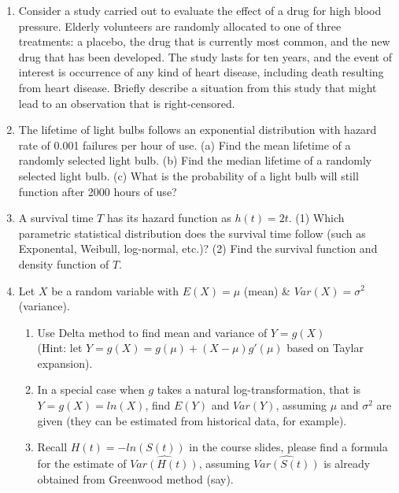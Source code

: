 \begin{enumerate}


\item Consider a study carried out to evaluate the effect of a drug for high blood pressure. Elderly volunteers are randomly allocated to one of three treatments: a placebo, the drug that is currently most common, and the new drug that has been developed. The study lasts for ten years, and the event of interest is occurrence of any kind of heart disease, including death resulting from heart disease. Briefly describe a situation from this study that might lead to an observation that is right-censored.

 \vspace{7 cm}

\item The lifetime of light bulbs follows an exponential distribution with hazard rate of 0.001 failures per hour of use. (a) Find the mean lifetime of a randomly selected light bulb. (b) Find the median lifetime of a randomly selected light bulb. (c) What is the probability of a light bulb will still function after 2000 hours of use?  

\vspace{7 cm}

\item A survival time $T$ has its hazard function as $h(t) = 2t$. (1) Which parametric statistical distribution does the survival time follow (such as Exponental, Weibull, log-normal, etc.)? (2) Find the survival function and density function of $T$. 

\vspace{7 cm}


\item Let $X$ be a random variable with $E(X) =\mu$ (mean) \& $Var(X) = \sigma^2$ (variance). 
\begin{enumerate}
\item Use Delta method to find mean and variance of $Y = g(X)$ \\(Hint: let $Y = g(X) = g(\mu) + (X - \mu) g'(\mu)$ based on Taylar expansion). 

\item In a special case when $g$ takes a natural log-transformation, that is $Y = g(X) = ln(X)$, find $E(Y)$ and $Var(Y)$, assuming $\mu$ and $\sigma^2$ are given (they can be estimated from historical data, for example). 

\item Recall $H(t) = - ln(S(t))$ in the course slides, please find a formula for the estimate of $\hat{Var(H(t))}$, assuming $\hat{Var(S(t))}$ is already obtained from Greenwood method (say).


\end{enumerate}
\end{enumerate}
